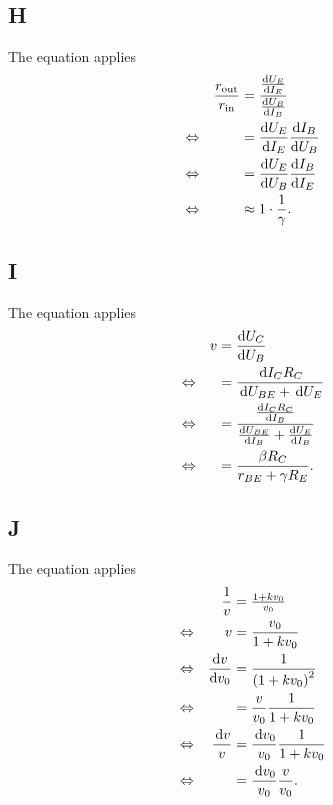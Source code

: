 \documentclass[a4paper,10pt]{article}
\newcommand{\td}{\,\text{d}}
\numberwithin{equation}{section}
\begin{document}
\begin{multicols}{2}
	\subsection{H}
        The equation applies
	\begin{align}
		                &  & \dfrac{r_\text{out}}{r_\text{in}} & = \dfrac{\diff[]{U_E}{I_E}}{\diff[]{U_B}{I_B}} &  &           \\
		\Leftrightarrow &  &                                   & = \diff[]{U_E}{I_E}\diff[]{I_B}{U_B}           &  & \nonumber \\
		\Leftrightarrow &  &                                   & = \diff[]{U_E}{U_B}\diff[]{I_B}{I_E}           &  & \nonumber \\
		\Leftrightarrow &  &                                   & \approx 1\cdot \dfrac{1}{\gamma }.             &  &
	\end{align}

	\subsection{I}
        The equation applies
	\begin{align}
		                &  & v & = \diff[]{U_C}{U_B}                                                    &  &           \\
		\Leftrightarrow &  &   & = \dfrac{\td I_CR_C}{\td U_{BE}+\td U_E}                               &  & \nonumber \\
		\Leftrightarrow &  &   & = \dfrac{\diff[]{I_CR_C}{I_B}}{\diff[]{U_{BE}}{I_B}+\diff[]{U_E}{I_B}} &  & \nonumber \\
		\Leftrightarrow &  &   & = \dfrac{\beta R_C}{r_{BE}+\gamma R_E}.                                &  &
	\end{align}

	\subsection{J}
        The equation applies
	\begin{align}
		                &  & \dfrac{1}{v}     & = \tfrac{1+kv_0}{v_0}                   &  &           \\
		\Leftrightarrow &  & v                & = \dfrac{v_0}{1+kv_0}                   &  & \nonumber \\
		\Leftrightarrow &  & \diff[]{v}{v_0}  & = \dfrac{1}{\left(1+kv_0\right)^2}      &  & \nonumber \\
		\Leftrightarrow &  &                  & = \dfrac{v}{v_0}\dfrac{1}{1+kv_0}       &  & \nonumber \\
		\Leftrightarrow &  & \dfrac{\td v}{v} & = \dfrac{\td v_0}{v_0}\dfrac{1}{1+kv_0} &  & \nonumber \\
		\Leftrightarrow &  &                  & = \dfrac{\td v_0}{v_0}\dfrac{v}{v_0}.   &  &
	\end{align}


\end{multicols}
\end{document}
